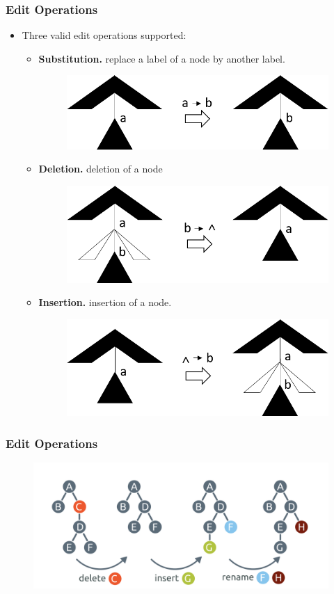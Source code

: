 \documentclass{beamer}
\begin{document}
\begin{frame}
\frametitle{Edit Operations}
\begin{itemize}
\item Three valid edit operations supported:
\begin{itemize}
\item \textbf{Substitution.} replace a label of a node by another label. 
\begin{figure}
	\includegraphics[width=0.4\linewidth]{Replacement}
	\label{Substitution} 
	\centering
\end{figure}
\item \textbf{Deletion.} deletion of a node
\begin{figure}
	\includegraphics[width=0.4\linewidth]{Delete}
	\label{Deletion} 
	\centering
\end{figure}
\item \textbf{Insertion.} insertion of a node.
\begin{figure}
	\includegraphics[width=0.4\linewidth]{Insertion}
	\label{Insertion} 
	\centering
\end{figure}
\end{itemize}
\end{itemize}
\end{frame}
\begin{frame}
\frametitle{Edit Operations}
\begin{figure}
	\includegraphics[width=1.0\linewidth]{EditExample}
	\label{Substitution} 
	\centering
\end{figure}
\end{frame}		
\end{document}

